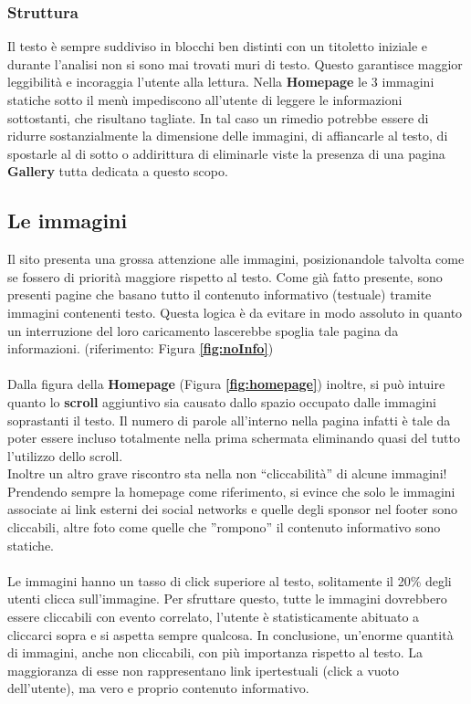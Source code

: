\documentclass[../Relazione.tex]{subfiles}
\begin{document}
			
		\subsubsection{Struttura}
			Il testo è sempre suddiviso in blocchi ben distinti con un titoletto iniziale e durante l'analisi non si sono mai trovati muri di testo. Questo garantisce maggior leggibilità e incoraggia l'utente alla lettura. Nella \textbf{Homepage} le 3 immagini statiche sotto il menù impediscono all'utente di leggere le informazioni sottostanti, che risultano tagliate.
			In tal caso un rimedio potrebbe essere di ridurre sostanzialmente la dimensione delle immagini, di affiancarle al testo, di spostarle al di sotto o addirittura di eliminarle viste la presenza di una pagina \textbf{Gallery} tutta dedicata a questo scopo.
						
	
	\newpage
	\subsection{Le immagini}\label{sec:img}
		Il sito presenta una grossa attenzione alle immagini, posizionandole talvolta come se fossero di priorità maggiore rispetto al testo.
		Come già fatto presente, sono presenti pagine che basano tutto il contenuto informativo (testuale) tramite immagini contenenti testo.
		Questa logica è da evitare in modo assoluto in quanto un interruzione del loro caricamento lascerebbe spoglia tale pagina da informazioni. (riferimento: Figura \textbf{\ref{fig:noInfo}})\\\\
		Dalla figura della \textbf{Homepage} (Figura \textbf{\ref{fig:homepage}}) inoltre, si può  intuire quanto lo \textbf{scroll} aggiuntivo sia causato dallo spazio occupato dalle immagini soprastanti il testo. Il numero di parole all'interno nella pagina infatti è tale da poter essere incluso totalmente nella prima schermata eliminando quasi del tutto l'utilizzo dello scroll.\\
		Inoltre un altro grave riscontro sta nella non ``cliccabilità'' di alcune immagini! Prendendo sempre la homepage come riferimento, si evince che solo le immagini associate ai link esterni dei social networks e quelle degli sponsor nel footer sono cliccabili, altre foto come quelle che ''rompono'' il contenuto informativo sono statiche.\\\\
		Le immagini hanno un tasso di click superiore al testo, solitamente il 20\% degli utenti clicca sull'immagine. Per sfruttare questo, tutte le immagini dovrebbero essere cliccabili con evento correlato, l’utente è statisticamente abituato a cliccarci sopra e si aspetta sempre qualcosa.
		In conclusione, un'enorme quantità di immagini, anche non cliccabili, con più importanza rispetto al testo. La maggioranza di esse non rappresentano link ipertestuali (click a vuoto dell'utente), ma vero e proprio contenuto informativo.
\end{document}
